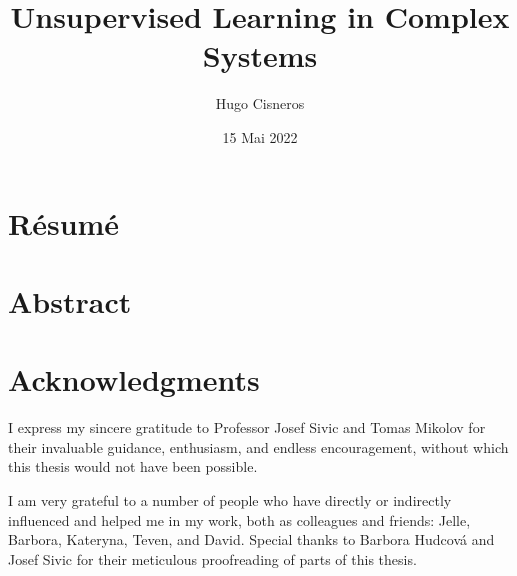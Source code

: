 \documentclass[11pt, twoside, openright]{thesis}
\title{Unsupervised Learning in Complex Systems}
\institute{L'École normale supérieure de Paris}
\author{Hugo Cisneros}
\date{15 Mai 2022}
\begin{document}
\frontmatter
\hypersetup{pageanchor=false}
\maketitle
\hypersetup{pageanchor=true}


\ifprintversion
    \pagestyle{fancy}
    \fancyhead{} %
    \fancyhead[ER,OL]{\footnotesize \rightmark} \fancyhead[EL,OR]{\thepage}
    \fancyfoot{} %
\else
    \pagestyle{fancy}
    \fancyhead{} %
    \fancyhead[R]{\footnotesize \rightmark} \fancyhead[L]{\thepage}
    \fancyfoot{} %
\fi

\cleardoublepage
\chapter*{Résumé}

\thefrabstract{}
\vfill
\thefrkeywords{}
\cleardoublepage
\chapter*{Abstract}
\theenabstract{}
\vfill
\theenkeywords{}

\cleardoublepage
\chapter*{Acknowledgments}

I express my sincere gratitude to Professor Josef Sivic and Tomas Mikolov for
their invaluable guidance, enthusiasm, and endless encouragement, without which
this thesis would not have been possible.

I am very grateful to a number of people who have directly or indirectly
influenced and helped me in my work, both as colleagues and friends: Jelle, Barbora, Kateryna, Teven, and David.
Special thanks to Barbora Hudcová and Josef Sivic for their meticulous
proofreading of parts of this thesis.
\end{document}
